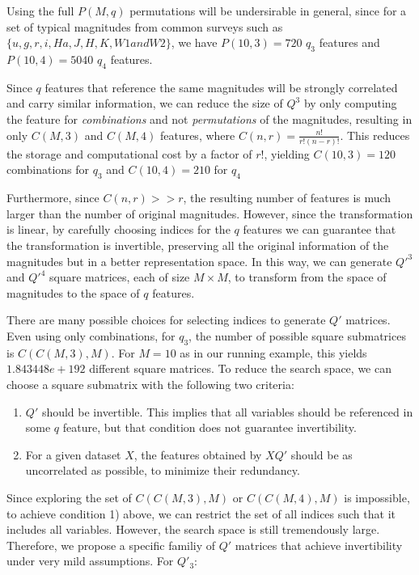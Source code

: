 \documentclass{article}
\begin{document}
Using the full $P(M,q)$ permutations will be undersirable in general, since for a set of typical magnitudes from common surveys such as $\{u, g, r, i, Ha, J, H, K, W1 and W2 \}$, we have $P(10,3)=720$ $q_3$ features and $P(10,4)=5040$ $q_4$ features.

Since $q$ features that reference the same magnitudes will be strongly correlated and carry similar information, we can reduce the size of $Q^3$ by only computing the feature for \emph{combinations} and not \emph{permutations} of the magnitudes, resulting in only $C(M,3)$ and $C(M,4)$ features, where $C(n,r)=\frac{n!}{r!(n-r)!}$. This reduces the storage and computational cost by a factor of $r!$, yielding $C(10,3)=120$ combinations for $q_3$ and $C(10,4)=210$ for $q_4$

Furthermore, since $C(n,r)>>r$, the resulting number of features is much larger than the number of original magnitudes. However, since the transformation is linear, by carefully choosing indices for the $q$ features we can guarantee that the transformation is invertible, preserving all the original information of the magnitudes but in a better representation space. In this way, we can generate  $Q'^3$ and $Q'^4$ square matrices, each of size $M\times M$, to transform from the space of magnitudes to the space of $q$ features.

There are many possible choices for selecting indices to generate $Q'$ matrices. Even using only combinations, for $q_3$, the number of possible square submatrices is $C(C(M,3),M)$. For $M=10$ as in our running example, this yields $1.843448e+192$ different square matrices. To reduce the search space, we can choose a square submatrix with the following two criteria:

\begin{enumerate}
    \item $Q'$ should be invertible. This implies that all variables should be referenced in some $q$ feature, but that condition does not guarantee invertibility.
    \item For a given dataset $X$, the features obtained by $XQ'$ should be as uncorrelated as possible, to minimize their redundancy.
\end{enumerate}

Since exploring the set of $C(C(M,3),M)$ or $C(C(M,4),M)$ is impossible,  to achieve condition 1) above, we can restrict the set of all indices such that it includes all variables. However, the search space is still tremendously large. Therefore, we propose a specific familiy of $Q'$ matrices that achieve invertibility under very mild assumptions. For $Q'_3$:
\end{document}
